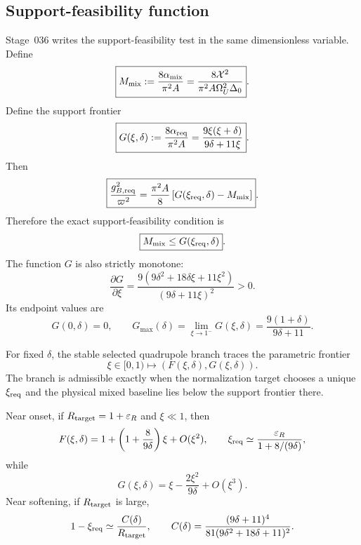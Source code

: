 \subsection{Support-feasibility function}
\label{subsec:part02-stage036-G}

Stage~036 writes the support-feasibility test in the same dimensionless variable.  Define
\begin{equation}
\label{eq:part02-Mmix}
\boxed{
M_{\rm mix}
:=
\frac{8\alpha_{\rm mix}}{\pi^2A}
=
\frac{8\mathcal{X}^2}{\pi^2A\Omega_U^2\Delta_0}}.
\end{equation}
Define the support frontier
\begin{equation}
\label{eq:part02-G-function}
\boxed{
G(\xi,\delta)
:=
\frac{8\alpha_{\rm req}}{\pi^2A}
=
\frac{9\xi(\xi+\delta)}{9\delta+11\xi}}.
\end{equation}
Then
\begin{equation}
\label{eq:part02-gB-req-dimensionless}
\boxed{
\frac{g_{B,{\rm req}}^2}{\varpi^2}
=
\frac{\pi^2A}{8}\left[G(\xi_{\rm req},\delta)-M_{\rm mix}\right]}.
\end{equation}
Therefore the exact support-feasibility condition is
\begin{equation}
\label{eq:part02-support-feasibility}
\boxed{
M_{\rm mix}\leq G(\xi_{\rm req},\delta)}.
\end{equation}
The function \(G\) is also strictly monotone:
\begin{equation}
\label{eq:part02-G-derivative}
\frac{\partial G}{\partial\xi}
=
\frac{9(9\delta^2+18\delta\xi+11\xi^2)}{(9\delta+11\xi)^2}>0.
\end{equation}
Its endpoint values are
\begin{equation}
\label{eq:part02-G-endpoints}
G(0,\delta)=0,
\qquad
G_{\max}(\delta)=\lim_{\xi\to1^-}G(\xi,\delta)
=
\frac{9(1+\delta)}{9\delta+11}.
\end{equation}

For fixed \(\delta\), the stable selected quadrupole branch traces the parametric frontier
\begin{equation}
\label{eq:part02-FG-frontier}
\boxed{
\xi\in[0,1)
\longmapsto
\left(F(\xi,\delta),G(\xi,\delta)\right)}.
\end{equation}
The branch is admissible exactly when the normalization target chooses a unique \(\xi_{\rm req}\) and the physical mixed baseline lies below the support frontier there.

Near onset, if \(R_{\rm target}=1+\varepsilon_R\) and \(\xi\ll1\), then
\begin{equation}
F(\xi,\delta)=1+\left(1+\frac{8}{9\delta}\right)\xi+O(\xi^2),
\qquad
\xi_{\rm req}\simeq\frac{\varepsilon_R}{1+8/(9\delta)},
\end{equation}
while
\begin{equation}
G(\xi,\delta)=\xi-\frac{2\xi^2}{9\delta}+O(\xi^3).
\end{equation}
Near softening, if \(R_{\rm target}\) is large,
\begin{equation}
1-\xi_{\rm req}\simeq
\frac{C(\delta)}{R_{\rm target}},
\qquad
C(\delta)=
\frac{(9\delta+11)^4}{81(9\delta^2+18\delta+11)^2}.
\end{equation}

